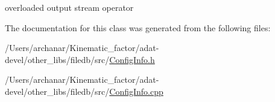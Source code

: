 overloaded output stream operator 

The documentation for this class was generated from the following files\+:\begin{DoxyCompactItemize}
\item 
/\+Users/archanar/\+Kinematic\+\_\+factor/adat-\/devel/other\+\_\+libs/filedb/src/\mbox{\hyperlink{adat-devel_2other__libs_2filedb_2src_2ConfigInfo_8h}{Config\+Info.\+h}}\item 
/\+Users/archanar/\+Kinematic\+\_\+factor/adat-\/devel/other\+\_\+libs/filedb/src/\mbox{\hyperlink{adat-devel_2other__libs_2filedb_2src_2ConfigInfo_8cpp}{Config\+Info.\+cpp}}\end{DoxyCompactItemize}
